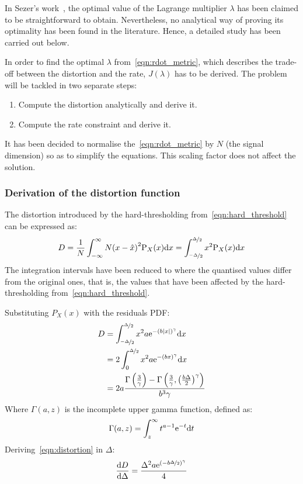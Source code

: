 \documentclass[11pt,a4paper,openright,twoside]{book}
\numberwithin{equation}{section} %
\numberwithin{figure}{section} %
\numberwithin{table}{section} %
\begin{document}
In Sezer's work~\cite{sezer-11-phd,sezer-08-sparse-orthonormal-transforms},
the optimal value of the Lagrange multiplier $\lambda$ has been claimed
to be straightforward to obtain.
Nevertheless, no analytical way of proving its optimality has been found in
the literature.
Hence, a detailed study has been carried out below.

In order to find the optimal $\lambda$ from~\eqref{eqn:rdot_metric},
which describes the trade-off between the distortion and the rate,
$J(\lambda)$ has to be derived.
The problem will be tackled in two separate steps:
\begin{enumerate}
	\item Compute the distortion analytically and derive it.
	\item Compute the rate constraint and derive it.
\end{enumerate}
It has been decided to normalise the~\eqref{eqn:rdot_metric} by $N$ (the
signal dimension) so as to simplify the equations.
This scaling factor does not affect the solution.

\subsubsection{Derivation of the distortion function}
\label{ssub:derivation_of_the_distortion_function}

The distortion introduced by the hard-thresholding
from~\eqref{eqn:hard_threshold} can be expressed as:
\begin{equation}
	D
	= \frac{1}{N} \int_{-\infty}^{\infty} N {(x - \hat x)}^2 \text{P}_X (x)\text{d} x
	= \int_{\nicefrac{-\Delta}{2}}^{\nicefrac{\Delta}{2}}
	\label{eqn:int_distortion}
	x^2\text{P}_X (x) \text{d} x
\end{equation}
The integration intervals have been reduced to where the quantised values
differ from the original ones, that is, the values that have been affected by
the hard-thresholding from~\eqref{eqn:hard_threshold}.

Substituting $P_X(x)$ with the residuals \ac{PDF}:
\begin{align}
	D
	&=\int_{\nicefrac{-\Delta}{2}}^{\nicefrac{\Delta}{2}}
	x^2 a \text{e}^{-{\left(b\vert x \vert\right)}^\gamma} \text{d} x \\
	&=2 \int_0^{\nicefrac{\Delta}{2}}
	x^2 a \text{e}^{-{\left(b x \right)}^\gamma} \text{d} x\\
	&=
		2a \frac{\Gamma\left(\frac{3}{\gamma}\right)-
		\Gamma\left(
		\frac{3}{\gamma},{\left(\frac{b\Delta}{2}\right)}^\gamma
		\right)}{b^3\gamma}
	\label{eqn:distortion}
\end{align}
Where $\Gamma(a,z)$ is the incomplete upper gamma function, defined as:
\begin{equation}
	\Gamma(a,z)=\int_z^\infty t^{a-1}\text{e}^{-t}\text{d} t
\end{equation}
Deriving~\eqref{eqn:distortion} in $\Delta$:
\begin{equation}
	\frac{\text{d} D}{\text{d}\Delta} =
	\frac{\Delta^2 a \text{e}^{{(-b\nicefrac{\Delta}{2})}^\gamma}}{4}
	\label{eqn:diff_distortion}
\end{equation}
\end{document}
